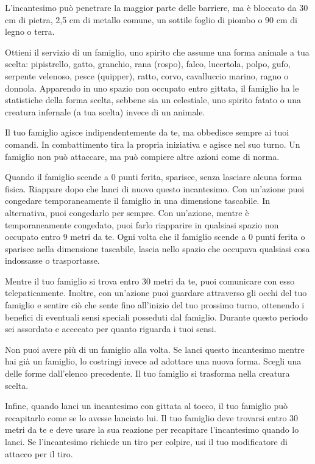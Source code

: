 \documentclass[letterpaper,twocolumn,openany,nodeprecatedcode,justified]{dndbook}
\begin{document}
L'incantesimo può penetrare la maggior parte delle barriere, ma è bloccato da 30 cm di pietra, 2,5 cm di metallo comune, un sottile foglio di piombo o 90 cm di legno o terra.


Ottieni il servizio di un famiglio, uno spirito che assume una forma animale a tua scelta: pipistrello, gatto, granchio, rana (rospo), falco, lucertola, polpo, gufo, serpente velenoso, pesce (quipper), ratto, corvo, cavalluccio marino, ragno o donnola. Apparendo in uno spazio non occupato entro gittata, il famiglio ha le statistiche della forma scelta, sebbene sia un celestiale, uno spirito fatato o una creatura infernale (a tua scelta) invece di un animale.

Il tuo famiglio agisce indipendentemente da te, ma obbedisce sempre ai tuoi comandi. In combattimento tira la propria iniziativa e agisce nel suo turno. Un famiglio non può attaccare, ma può compiere altre azioni come di norma.

Quando il famiglio scende a 0 punti ferita, sparisce, senza lasciare alcuna forma fisica. Riappare dopo che lanci di nuovo questo incantesimo. Con un'azione puoi congedare temporaneamente il famiglio in una dimensione tascabile. In alternativa, puoi congedarlo per sempre. Con un'azione, mentre è temporaneamente congedato, puoi farlo riapparire in qualsiasi spazio non occupato entro 9 metri da te. Ogni volta che il famiglio scende a 0 punti ferita o sparisce nella dimensione tascabile, lascia nello spazio che occupava qualsiasi cosa indossasse o trasportasse.

Mentre il tuo famiglio si trova entro 30 metri da te, puoi comunicare con esso telepaticamente. Inoltre, con un'azione puoi guardare attraverso gli occhi del tuo famiglio e sentire ciò che sente fino all'inizio del tuo prossimo turno, ottenendo i benefici di eventuali sensi speciali posseduti dal famiglio. Durante questo periodo sei assordato e accecato per quanto riguarda i tuoi sensi.

Non puoi avere più di un famiglio alla volta. Se lanci questo incantesimo mentre hai già un famiglio, lo costringi invece ad adottare una nuova forma. Scegli una delle forme dall'elenco precedente. Il tuo famiglio si trasforma nella creatura scelta.

Infine, quando lanci un incantesimo con gittata al tocco, il tuo famiglio può recapitarlo come se lo avesse lanciato lui. Il tuo famiglio deve trovarsi entro 30 metri da te e deve usare la sua reazione per recapitare l'incantesimo quando lo lanci. Se l'incantesimo richiede un tiro per colpire, usi il tuo modificatore di attacco per il tiro.
\end{document}
